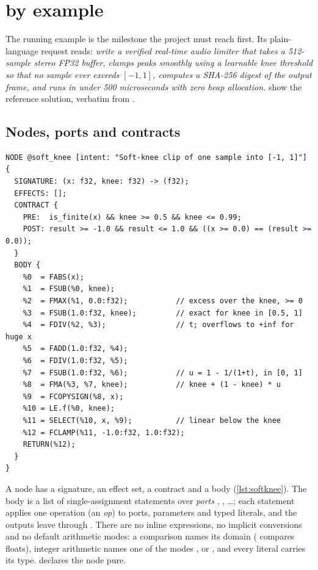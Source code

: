 \section{\VG{} by example}\label{sec:overview}

The running example is the milestone the project must reach first. Its plain-language request
reads: \emph{write a verified real-time audio limiter that takes a 512-sample stereo FP32
buffer, clamps peaks smoothly using a learnable knee threshold so that no sample ever exceeds
$[-1, 1]$, computes a SHA-256 digest of the output frame, and runs in under 500 microseconds
with zero heap allocation.}  show the reference solution,
verbatim from .

\subsection{Nodes, ports and contracts}

\begin{lstlisting}[float=t,caption={The soft-knee kernel, repaired version.},label=lst:softknee]
NODE @soft_knee [intent: "Soft-knee clip of one sample into [-1, 1]"] {
  SIGNATURE: (x: f32, knee: f32) -> (f32);
  EFFECTS: [];
  CONTRACT {
    PRE:  is_finite(x) && knee >= 0.5 && knee <= 0.99;
    POST: result >= -1.0 && result <= 1.0 && ((x >= 0.0) == (result >= 0.0));
  }
  BODY {
    %0  = FABS(x);
    %1  = FSUB(%0, knee);
    %2  = FMAX(%1, 0.0:f32);           // excess over the knee, >= 0
    %3  = FSUB(1.0:f32, knee);         // exact for knee in [0.5, 1]
    %4  = FDIV(%2, %3);                // t; overflows to +inf for huge x
    %5  = FADD(1.0:f32, %4);
    %6  = FDIV(1.0:f32, %5);
    %7  = FSUB(1.0:f32, %6);           // u = 1 - 1/(1+t), in [0, 1]
    %8  = FMA(%3, %7, knee);           // knee + (1 - knee) * u
    %9  = FCOPYSIGN(%8, x);
    %10 = LE.f(%0, knee);
    %11 = SELECT(%10, x, %9);          // linear below the knee
    %12 = FCLAMP(%11, -1.0:f32, 1.0:f32);
    RETURN(%12);
  }
}
\end{lstlisting}

A node has a signature, an effect set, a contract and a body (\cref{lst:softknee}). The body is
a list of single-assignment statements over \emph{ports} , , \dots; each
statement applies one operation (an \emph{op}) to ports, parameters and typed literals, and
the outputs leave through . There are no inline expressions, no implicit
conversions and no default arithmetic modes: a comparison names its domain ( compares
floats), integer arithmetic names one of the modes ,  or , and
every literal carries its type.  declares the node pure.

